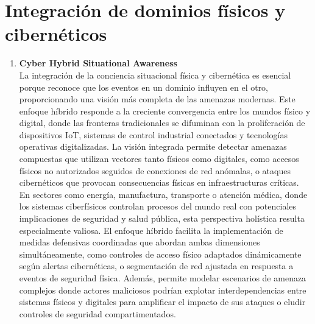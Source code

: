 \section{Integración de dominios físicos y cibernéticos}
\begin{enumerate}
\item \textbf{Cyber Hybrid Situational Awareness} \\
La integración de la conciencia situacional física y cibernética es esencial porque reconoce que los eventos en un dominio influyen en el otro, proporcionando una visión más completa de las amenazas modernas. Este enfoque híbrido responde a la creciente convergencia entre los mundos físico y digital, donde las fronteras tradicionales se difuminan con la proliferación de dispositivos IoT, sistemas de control industrial conectados y tecnologías operativas digitalizadas. La visión integrada permite detectar amenazas compuestas que utilizan vectores tanto físicos como digitales, como accesos físicos no autorizados seguidos de conexiones de red anómalas, o ataques cibernéticos que provocan consecuencias físicas en infraestructuras críticas. En sectores como energía, manufactura, transporte o atención médica, donde los sistemas ciberfísicos controlan procesos del mundo real con potenciales implicaciones de seguridad y salud pública, esta perspectiva holística resulta especialmente valiosa. El enfoque híbrido facilita la implementación de medidas defensivas coordinadas que abordan ambas dimensiones simultáneamente, como controles de acceso físico adaptados dinámicamente según alertas cibernéticas, o segmentación de red ajustada en respuesta a eventos de seguridad física. Además, permite modelar escenarios de amenaza complejos donde actores maliciosos podrían explotar interdependencias entre sistemas físicos y digitales para amplificar el impacto de sus ataques o eludir controles de seguridad compartimentados.


\end{enumerate}
